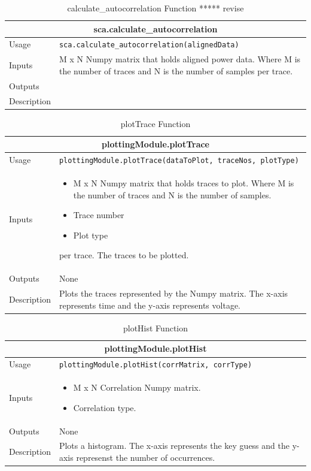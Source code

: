 \documentclass{llncs}
\numberwithin{algorithm}{chapter}
\begin{document}
\begin{table}[H]
\caption{calculate\_autocorrelation Function ***** revise}
\begin{tabular}{ |p{2cm}||p{11cm}|  }
 \hline
 \multicolumn{2}{|c|}{\cellcolor{teal}\textbf{sca.calculate\_autocorrelation}} \\
 \hline
 Usage & \texttt{sca.calculate\_autocorrelation(alignedData)}\\ \hline
 Inputs &  M x N Numpy matrix that holds aligned power data. Where M is the number of traces and N is
 the number of samples per trace. \\ \hline
 Outputs &  \\ \hline
 Description &  \\ \hline
\end{tabular}
\end{table}

\begin{table}[H]
\caption{plotTrace Function}
\begin{tabular}{ |p{2cm}||p{11cm}|  }
 \hline
 \multicolumn{2}{|c|}{\cellcolor{teal}\textbf{plottingModule.plotTrace}} \\
 \hline
 Usage & \texttt{plottingModule.plotTrace(dataToPlot, traceNos, plotType)}\\ \hline
 Inputs &  \begin{itemize}
 		   \item M x N Numpy matrix that holds traces to plot. Where M is the number of traces and N is the number of samples.
 		   \item Trace number
 		   \item Plot type
 		   \end{itemize}
per trace.
The traces to be plotted.
  \\ \hline
 Outputs & None \\ \hline
 Description & Plots the traces represented by the Numpy matrix. The x-axis represents time and the y-axis represents voltage. \\ \hline
\end{tabular}
\end{table}

\begin{table}[H]
\caption{plotHist Function}
\begin{tabular}{ |p{2cm}||p{11cm}|  }
 \hline
 \multicolumn{2}{|c|}{\cellcolor{teal}\textbf{plottingModule.plotHist}} \\
 \hline
 Usage & \texttt{plottingModule.plotHist(corrMatrix, corrType)}\\ \hline
 Inputs &  \begin{itemize}
 		   \item M x N Correlation Numpy matrix. 
 		   \item Correlation type.
 		   \end{itemize}  \\ \hline
 Outputs & None \\ \hline
 Description & Plots a histogram. The x-axis represents the key guess and the y-axis represenst the number of occurrences.
 \\ \hline
\end{tabular}
\end{table}
\end{document}
